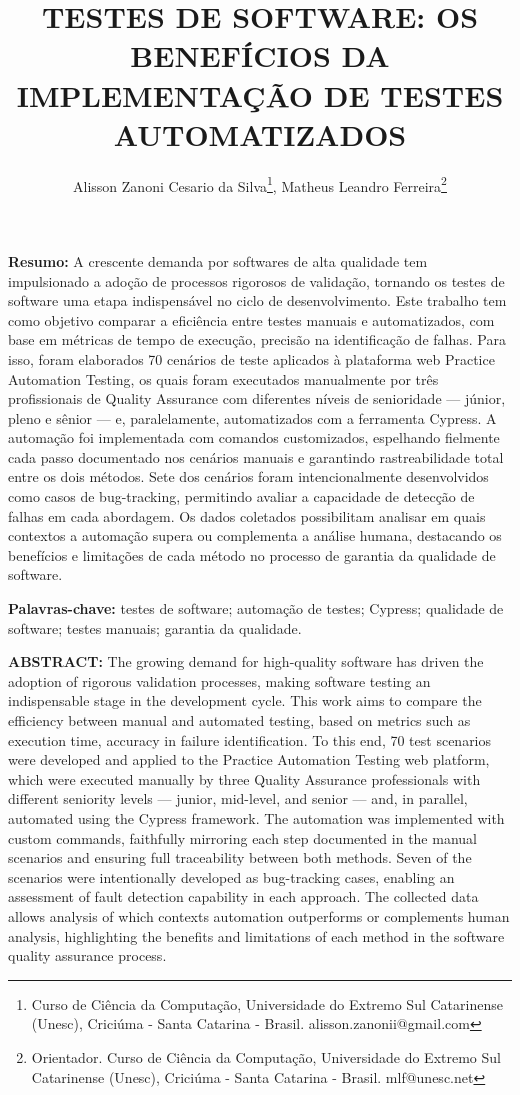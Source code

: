 \documentclass{UNESC}
\title{TESTES DE SOFTWARE: OS BENEFÍCIOS DA IMPLEMENTAÇÃO DE TESTES AUTOMATIZADOS}
\author
{
 Alisson Zanoni Cesario da Silva\footnote{Curso de Ciência da Computação, Universidade do Extremo Sul Catarinense (Unesc), Criciúma - Santa Catarina - Brasil. alisson.zanonii@gmail.com},
 Matheus Leandro Ferreira\footnote{Orientador. Curso de Ciência da Computação, Universidade do Extremo Sul Catarinense (Unesc), Criciúma - Santa Catarina - Brasil. mlf@unesc.net}
}
\begin{document}
\onehalfspacing
\maketitle

\noindent
\textbf{Resumo:} A crescente demanda por softwares de alta qualidade tem impulsionado a adoção de processos rigorosos de validação, tornando os testes de software uma etapa indispensável no ciclo de desenvolvimento. Este trabalho tem como objetivo comparar a eficiência entre testes manuais e automatizados, com base em métricas de tempo de execução, precisão na identificação de falhas. Para isso, foram elaborados 70 cenários de teste aplicados à plataforma web Practice Automation Testing, os quais foram executados manualmente por três profissionais de Quality Assurance com diferentes níveis de senioridade — júnior, pleno e sênior — e, paralelamente, automatizados com a ferramenta Cypress. A automação foi implementada com comandos customizados, espelhando fielmente cada passo documentado nos cenários manuais e garantindo rastreabilidade total entre os dois métodos. Sete dos cenários foram intencionalmente desenvolvidos como casos de bug-tracking, permitindo avaliar a capacidade de detecção de falhas em cada abordagem. Os dados coletados possibilitam analisar em quais contextos a automação supera ou complementa a análise humana, destacando os benefícios e limitações de cada método no processo de garantia da qualidade de software.


\vspace{0.5em}
\noindent
\textbf{Palavras-chave:} testes de software; automação de testes; Cypress; qualidade de software; testes manuais; garantia da qualidade.

\vspace{1.0em}
\noindent
\textbf{ABSTRACT:} The growing demand for high-quality software has driven the adoption of rigorous validation processes, making software testing an indispensable stage in the development cycle. This work aims to compare the efficiency between manual and automated testing, based on metrics such as execution time, accuracy in failure identification. To this end, 70 test scenarios were developed and applied to the Practice Automation Testing web platform, which were executed manually by three Quality Assurance professionals with different seniority levels — junior, mid-level, and senior — and, in parallel, automated using the Cypress framework. The automation was implemented with custom commands, faithfully mirroring each step documented in the manual scenarios and ensuring full traceability between both methods. Seven of the scenarios were intentionally developed as bug-tracking cases, enabling an assessment of fault detection capability in each approach. The collected data allows analysis of which contexts automation outperforms or complements human analysis, highlighting the benefits and limitations of each method in the software quality assurance process.
\end{document}
